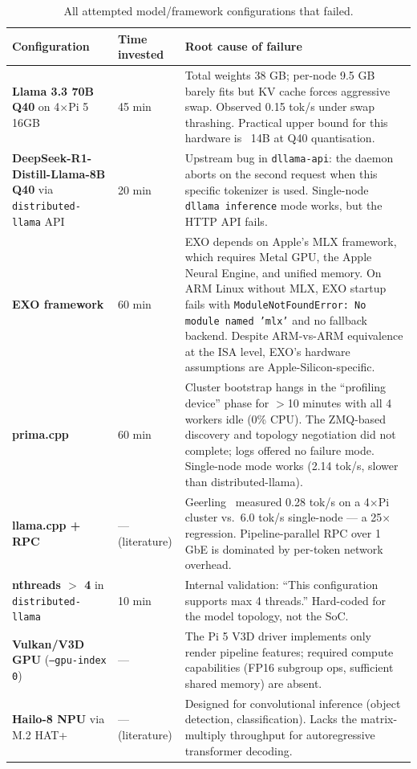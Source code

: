 \documentclass[10pt,a4paper]{article}
\begin{document}
\begin{table}[H]
\centering
\caption{All attempted model/framework configurations that failed.}
\scriptsize
\begin{tabular}{p{3.5cm}p{2cm}p{9cm}}
\toprule
\textbf{Configuration} & \textbf{Time invested} & \textbf{Root cause of failure} \\
\midrule
\textbf{Llama 3.3 70B Q40} on 4$\times$Pi 5 16GB & 45 min & Total weights 38 GB; per-node 9.5 GB barely fits but KV cache forces aggressive swap. Observed 0.15 tok/s under swap thrashing. Practical upper bound for this hardware is ~14B at Q40 quantisation. \\
\textbf{DeepSeek-R1-Distill-Llama-8B Q40} via \texttt{distributed-llama} API & 20 min & Upstream bug in \texttt{dllama-api}: the daemon aborts on the second request when this specific tokenizer is used. Single-node \texttt{dllama inference} mode works, but the HTTP API fails. \\
\textbf{EXO framework} \cite{exo2025} & 60 min & EXO depends on Apple's MLX framework, which requires Metal GPU, the Apple Neural Engine, and unified memory. On ARM Linux without MLX, EXO startup fails with \texttt{ModuleNotFoundError: No module named 'mlx'} and no fallback backend. Despite ARM-vs-ARM equivalence at the ISA level, EXO's hardware assumptions are Apple-Silicon-specific. \\
\textbf{prima.cpp} \cite{li2025prima} & 60 min & Cluster bootstrap hangs in the ``profiling device'' phase for $>$10 minutes with all 4 workers idle (0\% CPU). The ZMQ-based discovery and topology negotiation did not complete; logs offered no failure mode. Single-node mode works (2.14 tok/s, slower than distributed-llama). \\
\textbf{llama.cpp + RPC} & --- (literature) & Geerling~\cite{geerling2025} measured 0.28 tok/s on a 4$\times$Pi cluster vs.\ 6.0 tok/s single-node --- a 25$\times$ regression. Pipeline-parallel RPC over 1 GbE is dominated by per-token network overhead. \\
\textbf{nthreads $>$ 4} in \texttt{distributed-llama} & 10 min & Internal validation: ``This configuration supports max 4 threads.'' Hard-coded for the model topology, not the SoC. \\
\textbf{Vulkan/V3D GPU} (\texttt{--gpu-index 0}) & --- & The Pi 5 V3D driver implements only render pipeline features; required compute capabilities (FP16 subgroup ops, sufficient shared memory) are absent. \\
\textbf{Hailo-8 NPU} via M.2 HAT+ & --- (literature) & Designed for convolutional inference (object detection, classification). Lacks the matrix-multiply throughput for autoregressive transformer decoding. \\

\end{tabular}
\end{table}
\end{document}
